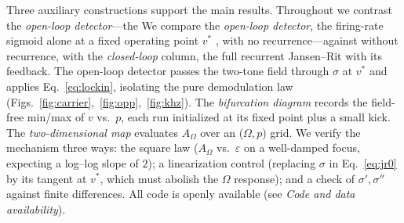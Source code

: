 \documentclass[11pt,a4paper]{article}
\newcommand{\Sig}{\sigma}
\providecommand{\DIFaddtex}[1]{{\protect\color{blue} \sf #1}} %
\providecommand{\DIFdeltex}[1]{{\protect\color{red} \scriptsize #1}} %
\providecommand{\DIFaddbegin}{} %
\providecommand{\DIFaddend}{} %
\providecommand{\DIFdelbegin}{} %
\providecommand{\DIFdelend}{} %
\providecommand{\DIFadd}[1]{\texorpdfstring{\DIFaddtex{#1}}{#1}} %
\providecommand{\DIFdel}[1]{\texorpdfstring{\DIFdeltex{#1}}{}} %
\begin{document}
\DIFdelbegin \DIFdel{Three auxiliary constructions support the main results. Throughout we contrast the
\emph{open-loop detector}---the }\DIFdelend \DIFaddbegin \DIFadd{We compare the \emph{open-loop detector}, the }\DIFaddend firing-rate sigmoid \DIFdelbegin \DIFdel{alone }\DIFdelend at a fixed
operating point $v^*$ \DIFdelbegin \DIFdel{, with no recurrence---against }\DIFdelend \DIFaddbegin \DIFadd{without recurrence, with }\DIFaddend the \emph{closed-loop} column, the full recurrent
Jansen--Rit with its feedback. The open-loop detector passes the two-tone field through
$\Sig$ at $v^*$ and applies Eq.~\eqref{eq:lockin}, isolating the pure demodulation law
(Figs.~\ref{fig:carrier},~\ref{fig:opp},~\ref{fig:khz}). The \emph{bifurcation
diagram} records the field-free min/max of $v$ vs.\ $p$, each run initialized at
its fixed point plus a small kick. The \emph{two-dimensional map} evaluates
$A_\Omega$ over an ($\Omega,p$) grid. We verify the mechanism three ways: the
square law ($A_\Omega$ vs.\ $\varepsilon$ on a well-damped focus, expecting a
log--log slope of $2$); a linearization control (replacing $\Sig$ in
Eq.~\eqref{eq:jr0} by its tangent at $v^*$, which must abolish the $\Omega$
response); and a check of $\Sig',\Sig''$ against finite differences. All code is
openly available (see \emph{Code and data availability}).
\end{document}

